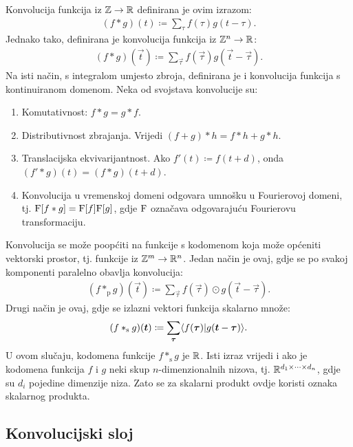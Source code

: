 \documentclass[utf8, diplomski, lmodern]{fer}
\begin{document}
Konvolucija funkcija iz $\mathbb{Z}\to\mathbb{R}$ definirana je ovim izrazom:
\begin{align}
(f*g)(t) \coloneqq \sum_\tau f(\tau)g(t-\tau) \text{.}
\end{align}
Jednako tako, definirana je konvolucija funkcija iz $\mathbb{Z}^n\to\mathbb{R}$:
\begin{align}
(f*g)(\vec t) \coloneqq \sum_{\vec\tau} f(\vec\tau)g(\vec t-\vec\tau) \text{.}
\end{align}
Na isti način, s integralom umjesto zbroja, definirana je i konvolucija funkcija s kontinuiranom domenom. Neka od svojstava konvolucije su:
\begin{enumerate}[topsep=0pt,itemsep=0pt,partopsep=0pt]
	\item Komutativnost: $f*g=g*f$.
	\item Distributivnost zbrajanja. Vrijedi $(f+g)*h=f*h+g*h$.	
	\item Translacijska ekvivarijantnost. Ako $f'(t) \coloneqq f(t+d)$, onda $(f'*g)(t)=(f*g)(t+d)$.
	\item Konvolucija u vremenskoj domeni odgovara umnošku u Fourierovoj domeni, tj. $\mathrm{F}[f*g]=\mathrm{F}[f]\mathrm{F}[g]$, gdje $\mathrm{F}$ označava odgovarajuću Fourierovu transformaciju.
\end{enumerate}

Konvolucija se može poopćiti na funkcije s kodomenom koja može općeniti vektorski prostor, tj. funkcije iz $\mathbb{Z}^m\to\mathbb{R}^n$. Jedan način je ovaj, gdje se po svakoj komponenti paralelno obavlja konvolucija:
\begin{align}
(f*_\text{p}g)(\vec t) \coloneqq 
\sum_{\vec\tau} f(\vec\tau)\odot g(\vec t-\vec\tau) \text{.}
\end{align}
Drugi način je ovaj, gdje se izlazni vektori funkcija skalarno množe:
\begin{align} \label{eq:konvolucija-s}
(f*_\text{s}g)(\vec t) \coloneqq 
\sum_{\vec\tau} \braket{f(\vec\tau)}{g(\vec t-\vec\tau)} \text{.}
\end{align}
U ovom slučaju, kodomena funkcije $f*_\text{s}g$ je $\mathbb{R}$. Isti izraz vrijedi i ako je kodomena funkcija $f$ i $g$ neki skup $n$-dimenzionalnih nizova, tj. $\mathbb{R}^{d_1\times\dots\times d_n}$, gdje su $d_i$ pojedine dimenzije niza. Zato se za skalarni produkt ovdje koristi oznaka skalarnog produkta.

\subsection{Konvolucijski sloj}
\end{document}
